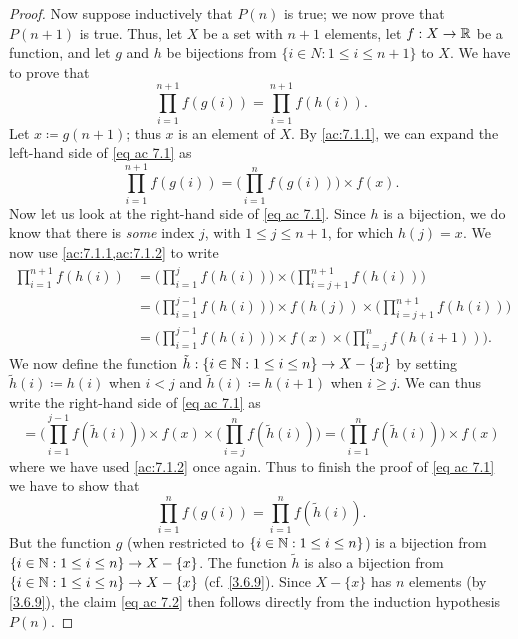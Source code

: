 \begin{proof}
  Now suppose inductively that \(P(n)\) is true;
  we now prove that \(P(n + 1)\) is true.
  Thus, let \(X\) be a set with \(n + 1\) elements, let \(f : X \to \mathbb{R}\) be a function, and let \(g\) and \(h\) be bijections from \(\{i \in N : 1 \leq i \leq n + 1\}\) to \(X\).
  We have to prove that
  \[
    \prod_{i = 1}^{n + 1} f(g(i)) = \prod_{i = 1}^{n + 1} f(h(i)). \tag{ac 7.1}\label{eq ac 7.1}
  \]
  Let \(x \coloneqq g(n + 1)\);
  thus \(x\) is an element of \(X\).
  By \cref{ac:7.1.1}, we can expand the left-hand side of \eqref{eq ac 7.1} as
  \[
    \prod_{i = 1}^{n + 1} f(g(i)) = \Bigg(\prod_{i = 1}^n f(g(i))\Bigg) \times f(x).
  \]
  Now let us look at the right-hand side of \eqref{eq ac 7.1}.
  Since \(h\) is a bijection, we do know that there is \emph{some} index \(j\), with \(1 \leq j \leq n + 1\), for which \(h(j) = x\).
  We now use \cref{ac:7.1.1,ac:7.1.2} to write
  \begin{align*}
    \prod_{i = 1}^{n + 1} f(h(i)) & = \Bigg(\prod_{i = 1}^j f(h(i))\Bigg) \times \Bigg(\prod_{i = j + 1}^{n + 1} f(h(i))\Bigg)                      \\
                                  & = \Bigg(\prod_{i = 1}^{j - 1} f(h(i))\Bigg) \times f(h(j)) \times \Bigg(\prod_{i = j + 1}^{n + 1} f(h(i))\Bigg) \\
                                  & = \Bigg(\prod_{i = 1}^{j - 1} f(h(i))\Bigg) \times f(x) \times \Bigg(\prod_{i = j}^n f(h(i + 1))\Bigg).
  \end{align*}
  We now define the function \(\tilde{h} : \{i \in \mathbb{N} : 1 \leq i \leq n\} \to X - \{x\}\) by setting \(\tilde{h}(i) \coloneqq h(i)\) when \(i < j\) and \(\tilde{h}(i) \coloneqq h(i + 1)\) when \(i \geq j\).
  We can thus write the right-hand side of \eqref{eq ac 7.1} as
  \[
    = \Bigg(\prod_{i = 1}^{j - 1} f(\tilde{h}(i))\Bigg) \times f(x) \times \Bigg(\prod_{i = j}^n f(\tilde{h}(i))\Bigg) = \Bigg(\prod_{i = 1}^n f(\tilde{h}(i))\Bigg) \times f(x)
  \]
  where we have used \cref{ac:7.1.2} once again.
  Thus to finish the proof of \eqref{eq ac 7.1} we have to show that
  \[
    \prod_{i = 1}^n f(g(i)) = \prod_{i = 1}^n f(\tilde{h}(i)). \tag{ac 7.2}\label{eq ac 7.2}
  \]
  But the function \(g\) (when restricted to \(\{i \in \mathbb{N} : 1 \leq i \leq n\}\)) is a bijection from \(\{i \in \mathbb{N} : 1 \leq i \leq n\} \to X - \{x\}\).
  The function \(\tilde{h}\) is also a bijection from \(\{i \in \mathbb{N} : 1 \leq i \leq n\} \to X - \{x\}\) (cf. \cref{3.6.9}).
  Since \(X - \{x\}\) has \(n\) elements (by \cref{3.6.9}), the claim \eqref{eq ac 7.2} then follows directly from the induction hypothesis \(P(n)\).
\end{proof}

